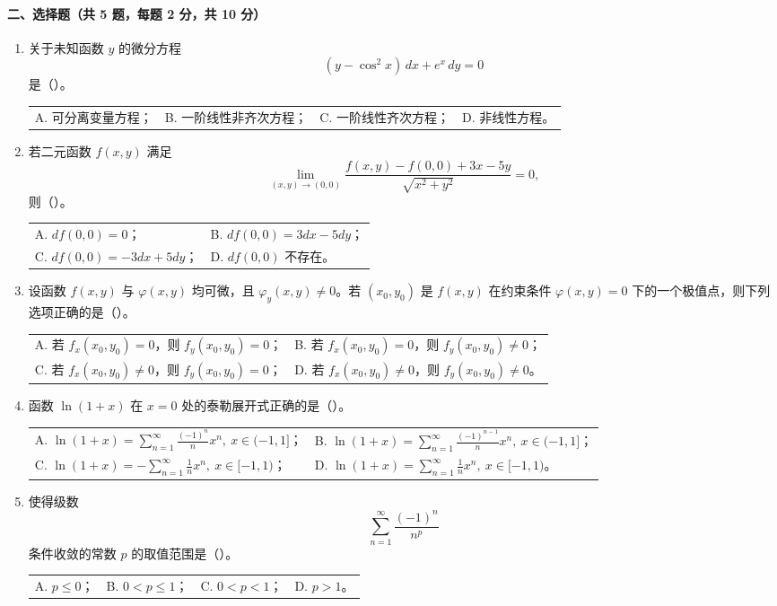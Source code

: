 \paragraph*{二、选择题（共 5 题，每题 2 分，共 10 分）}
\begin{enumerate}
  \item 关于未知函数 $y$ 的微分方程
  \[
    (y-\cos^2 x)\,dx+e^x\,dy=0
  \]
  是（\quad）。

  \begin{tabular}{llll}
    A. 可分离变量方程； & B. 一阶线性非齐次方程； &
    C. 一阶线性齐次方程； & D. 非线性方程。
  \end{tabular}

  \item 若二元函数 $f(x,y)$ 满足
  \[
    \lim_{(x,y)\to(0,0)}
    \frac{f(x,y)-f(0,0)+3x-5y}{\sqrt{x^2+y^2}}=0,
  \]
  则（\quad）。

  \begin{tabular}{ll}
    A. $df(0,0)=0$； & B. $df(0,0)=3dx-5dy$；\\
    C. $df(0,0)=-3dx+5dy$； & D. $df(0,0)$ 不存在。
  \end{tabular}

  \item 设函数 $f(x,y)$ 与 $\varphi(x,y)$ 均可微，且 $\varphi_y(x,y)\ne0$。若 $(x_0,y_0)$ 是 $f(x,y)$ 在约束条件
  $\varphi(x,y)=0$ 下的一个极值点，则下列选项正确的是（\quad）。

  \begin{tabular}{ll}
    A. 若 $f_x(x_0,y_0)=0$，则 $f_y(x_0,y_0)=0$； &
    B. 若 $f_x(x_0,y_0)=0$，则 $f_y(x_0,y_0)\ne0$；\\
    C. 若 $f_x(x_0,y_0)\ne0$，则 $f_y(x_0,y_0)=0$； &
    D. 若 $f_x(x_0,y_0)\ne0$，则 $f_y(x_0,y_0)\ne0$。
  \end{tabular}

  \item 函数 $\ln(1+x)$ 在 $x=0$ 处的泰勒展开式正确的是（\quad）。

  \begin{tabular}{ll}
    A. $\displaystyle \ln(1+x)=\sum_{n=1}^{\infty}\frac{(-1)^n}{n}x^n,\ x\in(-1,1]$； &
    B. $\displaystyle \ln(1+x)=\sum_{n=1}^{\infty}\frac{(-1)^{n-1}}{n}x^n,\ x\in(-1,1]$；\\
    C. $\displaystyle \ln(1+x)=-\sum_{n=1}^{\infty}\frac{1}{n}x^n,\ x\in[-1,1)$； &
    D. $\displaystyle \ln(1+x)=\sum_{n=1}^{\infty}\frac{1}{n}x^n,\ x\in[-1,1)$。
  \end{tabular}

  \item 使得级数
  \[
    \sum_{n=1}^{\infty}\frac{(-1)^n}{n^p}
  \]
  条件收敛的常数 $p$ 的取值范围是（\quad）。

  \begin{tabular}{llll}
    A. $p\le0$； & B. $0<p\le1$； & C. $0<p<1$； & D. $p>1$。
  \end{tabular}
\end{enumerate}

